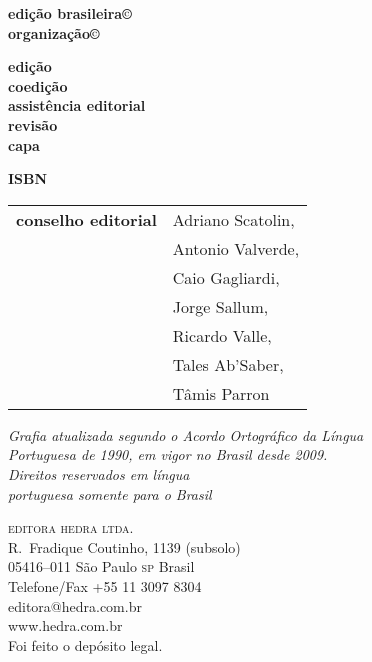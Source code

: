 \newcommand{\linha}[2]{\ifdef{#2}{\linhalayout{#1}{#2}}{}}

\begingroup\tiny
\parindent=0cm
\thispagestyle{empty}

\textbf{edição brasileira©}\\
\textbf{organização©}\\
\smallskip

\textbf{edição}\\
\textbf{coedição}\\
\textbf{assistência editorial}\\
\textbf{revisão}\\
\textbf{capa}\\
\smallskip

\textbf{ISBN}\smallskip

\hspace{-5pt}\begin{tabular}{ll}
\textbf{conselho editorial} & Adriano Scatolin,  \\
							& Antonio Valverde,  \\
							& Caio Gagliardi,    \\
							& Jorge Sallum,      \\
							& Ricardo Valle,     \\
							& Tales Ab'Saber,    \\
							& Tâmis Parron      
\end{tabular}
 

\vfill

\textit{Grafia atualizada segundo o Acordo Ortográfico da Língua\\
Portuguesa de 1990, em vigor no Brasil desde 2009.}\\

\textit{Direitos reservados em língua\\ 
portuguesa somente para o Brasil}\\\smallskip

\textsc{editora hedra ltda.}\\
R.~Fradique Coutinho, 1139 (subsolo)\\
05416--011 São Paulo \textsc{sp} Brasil\\
Telefone/Fax +55 11 3097 8304\\\smallskip
editora@hedra.com.br\\
www.hedra.com.br\\
\bigskip
Foi feito o depósito legal.

\endgroup
\pagebreak